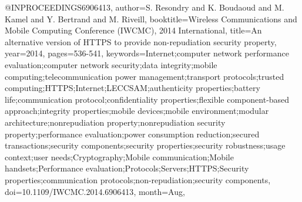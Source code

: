 @INPROCEEDINGS{6906413, 
author={S. Resondry and K. Boudaoud and M. Kamel and Y. Bertrand and M. Riveill}, 
booktitle={Wireless Communications and Mobile Computing Conference (IWCMC), 2014 International}, 
title={An alternative version of HTTPS to provide non-repudiation security property}, 
year={2014}, 
pages={536-541}, 
keywords={Internet;computer network performance evaluation;computer network security;data integrity;mobile computing;telecommunication power management;transport protocols;trusted computing;HTTPS;Internet;LECCSAM;authenticity properties;battery life;communication protocol;confidentiality properties;flexible component-based approach;integrity properties;mobile devices;mobile environment;modular architecture;nonrepudiation property;nonrepudiation security property;performance evaluation;power consumption reduction;secured transactions;security components;security properties;security robustness;usage context;user needs;Cryptography;Mobile communication;Mobile handsets;Performance evaluation;Protocols;Servers;HTTPS;Security properties;communication protocols;non-repudiation;security components}, 
doi={10.1109/IWCMC.2014.6906413}, 
month={Aug},}
